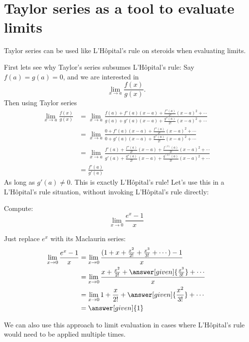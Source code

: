 \documentclass{ximera}
\begin{document}
\section{Taylor series as a tool to evaluate limits}

Taylor series can be used like L'H\^{o}pital's rule on steroids when
evaluating limits.

First lets see why Taylor's series subsumes L'H\^{o}pital's rule: Say
$f(a) = g(a) = 0$, and we are interested in
\[
\lim_{x \to a}\frac{f(x)}{g(x)}.
\]
Then using Taylor series
\begin{align*}
	\lim_{x \to a} \frac{f(x)}{g(x)} &= \lim_{x \to a} \frac{f(a)+f'(a)(x-a)+\frac{f''(a)}{2!}(x-a)^2+\cdots}{g(a)+g'(a)(x-a)+\frac{g''(a)}{2!}(x-a)^2+\cdots}\\
		&=  \lim_{x \to a} \frac{0+f'(a)(x-a)+\frac{f''(a)}{2!}(x-a)^2+\cdots}{0+g'(a)(x-a)+\frac{g''(a)}{2!}(x-a)^2+\cdots}\\
		&=  \lim_{x \to a} \frac{f'(a)+\frac{f''(a)}{2!}(x-a)+\frac{f^{(3)}(a)}{3!}(x-a)^2+\cdots}{g'(a)+\frac{g''(a)}{2!}(x-a)+\frac{g^{(3)}(a)}{3!}(x-a)^2+\cdots}\\
		&=\frac{f'(a)}{g'(a)}
\end{align*}
As long as $g'(a) \neq 0$.  This is exactly L'H\^{o}pital's rule!
Let's use this in a L'H\^{o}pital's rule situation, without invoking
L'H\^{o}pital's rule directly:

\begin{example}
  Compute:
  \[
  \lim_{x \to 0} \frac{e^x - 1}{x}
  \]
  \begin{explanation}
    Just replace $e^x$ with its Maclaurin series:
    \begin{align*}
      \lim_{x \to 0} \frac{e^x - 1}{x} &= \lim_{x \to 0} \frac{(1+x+\frac{x^2}{2!}+\frac{x^3}{3!}+\cdots) - 1}{x}\\
      &= \lim_{x \to 0} \frac{x+\frac{x^2}{2!} +\answer[given]{\frac{x^3}{3!}}+\cdots}{x}\\
      &=\lim_{x \to 0} 1+\frac{x}{2!}+\answer[given]{\frac{x^2}{3!}}+\cdots\\
      &=\answer[given]{1}
    \end{align*}
  \end{explanation}
\end{example}

We can also use this approach to limit evaluation in cases where
L'H\^{o}pital's rule would need to be applied multiple times.
\end{document}
